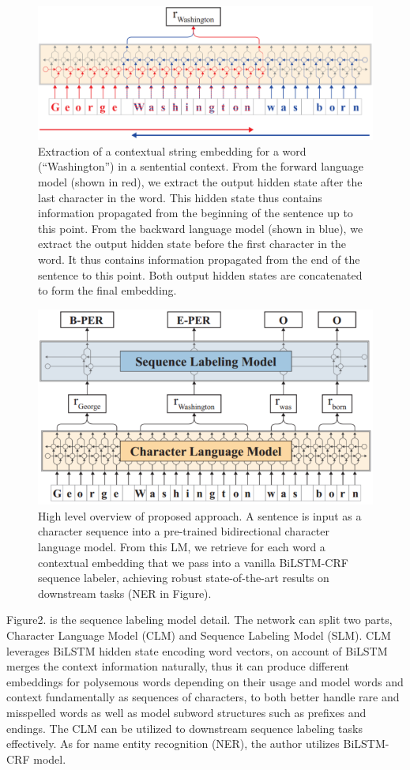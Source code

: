 \documentclass[10pt,twocolumn,letterpaper]{article}
\begin{document}
\begin{figure}
	\begin{center}
		\includegraphics[width=.5\linewidth]{CRL.png}
	\end{center}
	\caption{Extraction of a contextual string embedding for a word (“Washington”) in a sentential 
	context. From the forward language model (shown in red), we extract the output hidden state after 
	the last character in the word. This hidden state thus contains information propagated from the
	beginning of the sentence up to this point. From the backward language model (shown in blue), 
	we extract the output hidden state before the first character in the word. It thus contains 
	information propagated from the end of the sentence to this point. Both output hidden states 
	are concatenated to form the final embedding.}
	\label{fig:short}
\end{figure}

\begin{figure}
	\begin{center}
		\includegraphics[width=.5\linewidth]{modelstructure.png}
	\end{center}
	\caption{High level overview of proposed approach. A sentence is input as a character sequence
		into a pre-trained bidirectional character language model. From this LM, we retrieve for 
		each word a contextual embedding that we pass into a vanilla BiLSTM-CRF sequence labeler, 
		achieving robust state-of-the-art results on downstream tasks (NER in Figure).}
	\label{fig:short}
\end{figure}

Figure2. is the sequence labeling model detail. The network can split two parts, Character Language
Model (CLM) and Sequence Labeling Model (SLM). CLM leverages BiLSTM hidden state encoding word vectors,
on account of BiLSTM merges the context information naturally, thus it can  produce different embeddings 
for polysemous words depending on their usage and model words and context fundamentally as sequences 
of characters, to both better handle rare and misspelled words as well as model subword structures 
such as prefixes and endings. The CLM can be utilized to downstream sequence labeling tasks effectively. 
As for name entity recognition (NER), the author utilizes BiLSTM-CRF model.
\end{document}
